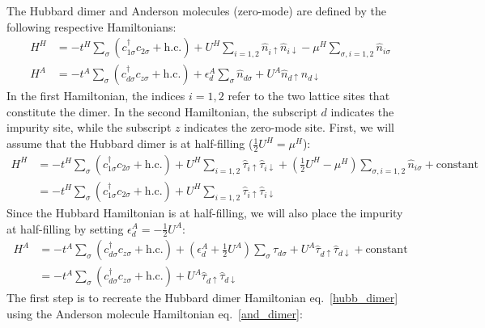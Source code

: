 \documentclass{report}
\numberwithin{equation}{section}
\begin{document}
The Hubbard dimer and Anderson molecules (zero-mode) are defined by the following respective Hamiltonians:
\begin{equation}\begin{aligned}
	H^H &= -t^H\sum_{\sigma}\left(c^\dagger_{1\sigma}c_{2\sigma} + \text{h.c.}\right) + U^H\sum_{i=1,2}\hat n_{i \uparrow}\hat n_{i \downarrow} - \mu^H \sum_{\sigma, i=1,2}\hat n_{i\sigma}\\
	H^A &= -t^A\sum_{\sigma}\left(c^\dagger_{d\sigma}c_{z\sigma} + \text{h.c.}\right) + \epsilon_d^A \sum_{\sigma}\hat n_{d\sigma} + U^A\hat n_{d \uparrow}\hat n_{d \downarrow}
\end{aligned}\end{equation}
In the first Hamiltonian, the indices \(i=1,2\) refer to the two lattice sites that constitute the dimer. In the second Hamiltonian, the subscript \(d\) indicates the impurity site, while the subscript \(z\) indicates the zero-mode site. First, we will assume that the Hubbard dimer is at half-filling (\(\frac{1}{2}U^H = \mu^H\)):
\begin{equation}\begin{aligned}
	\label{hubb_dimer}
	H^H &= -t^H\sum_{\sigma}\left(c^\dagger_{1\sigma}c_{2\sigma} + \text{h.c.}\right) + U^H\sum_{i=1,2}\hat \tau_{i \uparrow}\hat \tau_{i \downarrow} + \left(\frac{1}{2}U^H- \mu^H\right) \sum_{\sigma, i=1,2}\hat n_{i\sigma} + \text{constant}\\
	    &= -t^H\sum_{\sigma}\left(c^\dagger_{1\sigma}c_{2\sigma} + \text{h.c.}\right) + U^H\sum_{i=1,2}\hat \tau_{i \uparrow}\hat \tau_{i \downarrow}
\end{aligned}\end{equation}
Since the Hubbard Hamiltonian is at half-filling, we will also place the impurity at half-filling by setting \(\epsilon_d^A = -\frac{1}{2}U^A\):
\begin{equation}\begin{aligned}
	\label{and_dimer}
	H^A &= -t^A\sum_{\sigma}\left(c^\dagger_{d\sigma}c_{z\sigma} + \text{h.c.}\right) + \left(\epsilon_d^A + \frac{1}{2}U^A\right) \sum_{\sigma}\hat \tau_{d\sigma} + U^A\hat \tau_{d \uparrow}\hat \tau_{d \downarrow} + \text{constant}\\
	    &= -t^A\sum_{\sigma}\left(c^\dagger_{d\sigma}c_{z\sigma} + \text{h.c.}\right) + U^A\hat \tau_{d \uparrow}\hat \tau_{d \downarrow}
\end{aligned}\end{equation}
The first step is to recreate the Hubbard dimer Hamiltonian eq.~\ref{hubb_dimer} using the Anderson molecule Hamiltonian eq.~\ref{and_dimer}:
\end{document}

